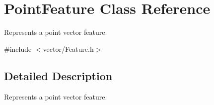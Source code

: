 \hypertarget{class_point_feature}{}\section{Point\+Feature Class Reference}
\label{class_point_feature}


Represents a point vector feature.  




{\ttfamily \#include $<$vector/\+Feature.\+h$>$}



\subsection{Detailed Description}
Represents a point vector feature. 